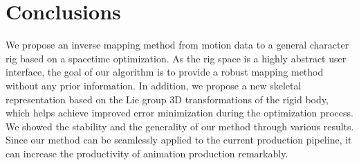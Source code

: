 
\section{Conclusions}
We propose an inverse mapping method from motion data to a general character rig based on a spacetime optimization.
As the rig space is a highly abstract user interface, the goal of our algorithm is to provide a robust mapping method without any prior information.
In addition, we propose a new skeletal representation based on the Lie group 3D transformations of the rigid body, which helps achieve improved error minimization during the  optimization process.
We showed the stability and the generality of our method through various results.
Since our method can be seamlessly applied to the current production pipeline, it can increase the productivity of animation production remarkably.



